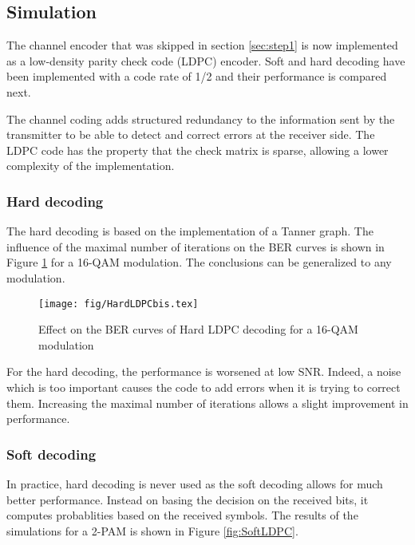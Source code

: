 \subsection{Simulation}

The channel encoder that was skipped in section \ref{sec:step1} is now implemented as a low-density parity check code (LDPC) encoder. Soft and hard decoding have been implemented with a code rate of 1/2 and their performance is compared next.

The channel coding adds structured redundancy  to the information sent by the transmitter to be able to detect and correct errors at the receiver side. The LDPC code has the property that the check matrix is sparse, allowing a lower complexity of the implementation.

\subsubsection{Hard decoding}
\iffalse
\begin{figure}[H]
\centering
    \texttt{[image: fig/HardLDPC.tex]}
     \caption{Hard LDPC}
    \label{fig:HardLDPC}
\end{figure}
\fi

The hard decoding is based on the implementation of a Tanner graph. The influence of the maximal number of iterations on the BER curves is shown in Figure \ref{fig:HardLDPCbis} for a 16-QAM modulation. The conclusions can be generalized to any modulation.

\begin{figure}[H]
\centering
    \texttt{[image: fig/HardLDPCbis.tex]}
     \caption{Effect on the BER curves of Hard LDPC decoding for a 16-QAM modulation}
    \label{fig:HardLDPCbis}
\end{figure}

For the hard decoding, the performance is worsened at low SNR. Indeed, a noise which is too important causes the code to add errors when it is trying to correct them. Increasing the maximal number of iterations allows a slight improvement in performance.

\subsubsection{Soft decoding}

In practice, hard decoding is never used as the soft decoding allows for much better performance. Instead on basing the decision on the received bits, it computes probablities based on the received symbols. The results of the simulations for a 2-PAM is shown in Figure \ref{fig:SoftLDPC}.

